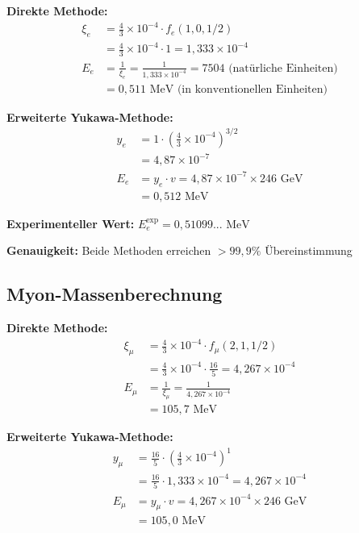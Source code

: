 \documentclass[12pt,a4paper]{article}
\begin{document}
	\textbf{Direkte Methode:}
	\begin{align}
		\xi_e &= \frac{4}{3} \times 10^{-4} \cdot f_e(1,0,1/2) \\
		&= \frac{4}{3} \times 10^{-4} \cdot 1 = 1,333 \times 10^{-4} \\
		E_{e} &= \frac{1}{\xi_e} = \frac{1}{1,333 \times 10^{-4}} = 7504 \text{ (natürliche Einheiten)} \\
		&= 0,511 \text{ MeV (in konventionellen Einheiten)}
	\end{align}
	
	\textbf{Erweiterte Yukawa-Methode:}
	\begin{align}
		y_e &= 1 \cdot \left(\frac{4}{3} \times 10^{-4}\right)^{3/2} \\
		&= 4,87 \times 10^{-7} \\
		E_e &= y_e \cdot v = 4,87 \times 10^{-7} \times 246 \text{ GeV} \\
		&= 0,512 \text{ MeV}
	\end{align}
	
	\textbf{Experimenteller Wert:} $E_e^{\text{exp}} = 0,51099... \text{ MeV}$
	
	\textbf{Genauigkeit:} Beide Methoden erreichen $> 99,9\%$ Übereinstimmung
	
	\subsection{Myon-Massenberechnung}
	\label{subsec:muon_calculation}
	
	\textbf{Direkte Methode:}
	\begin{align}
		\xi_\mu &= \frac{4}{3} \times 10^{-4} \cdot f_\mu(2,1,1/2) \\
		&= \frac{4}{3} \times 10^{-4} \cdot \frac{16}{5} = 4,267 \times 10^{-4} \\
		E_{\mu} &= \frac{1}{\xi_\mu} = \frac{1}{4,267 \times 10^{-4}} \\
		&= 105,7 \text{ MeV}
	\end{align}
	
	\textbf{Erweiterte Yukawa-Methode:}
	\begin{align}
		y_\mu &= \frac{16}{5} \cdot \left(\frac{4}{3} \times 10^{-4}\right)^1 \\
		&= \frac{16}{5} \cdot 1,333 \times 10^{-4} = 4,267 \times 10^{-4} \\
		E_\mu &= y_\mu \cdot v = 4,267 \times 10^{-4} \times 246 \text{ GeV} \\
		&= 105,0 \text{ MeV}
	\end{align}
	
\end{document}
